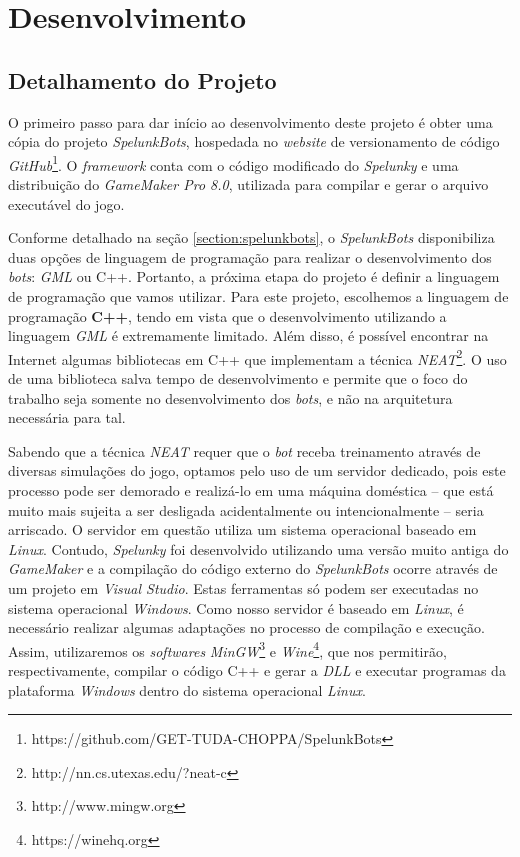 \chapter{\label{chap:development}Desenvolvimento}


\section{\label{section:project-details}Detalhamento do Projeto}
O primeiro passo para dar início ao desenvolvimento deste projeto é obter uma
cópia do projeto \textit{SpelunkBots}, hospedada no \textit{website} de
versionamento de código
\textit{GitHub}\footnote{https://github.com/GET-TUDA-CHOPPA/SpelunkBots}. O
\textit{framework} conta com o código modificado do \textit{Spelunky} e uma
distribuição do \textit{GameMaker Pro 8.0}, utilizada para compilar e gerar o
arquivo executável do jogo.

Conforme detalhado na seção \ref{section:spelunkbots}, o \textit{SpelunkBots}
disponibiliza duas opções de linguagem de programação para realizar o
desenvolvimento dos \textit{bots}: \textit{GML} ou C++. Portanto, a próxima
etapa do projeto é definir a linguagem de programação que vamos utilizar. Para
este projeto, escolhemos a linguagem de programação \textbf{C++}, tendo em vista
que o desenvolvimento utilizando a linguagem \textit{GML} é extremamente
limitado. Além disso, é possível encontrar na Internet algumas bibliotecas em
C++ que implementam a técnica
\textit{NEAT}\footnote{http://nn.cs.utexas.edu/?neat-c}. O uso de uma biblioteca
salva tempo de desenvolvimento e permite que o foco do trabalho seja somente no
desenvolvimento dos \textit{bots}, e não na arquitetura necessária para tal.

Sabendo que a técnica \textit{NEAT} requer que o \textit{bot} receba treinamento
através de diversas simulações do jogo, optamos pelo uso de um servidor
dedicado, pois este processo pode ser demorado e realizá-lo em uma máquina
doméstica -- que está muito mais sujeita a ser desligada acidentalmente ou
intencionalmente -- seria arriscado. O servidor em questão utiliza um sistema
operacional baseado em \textit{Linux}.  Contudo, \textit{Spelunky} foi
desenvolvido utilizando uma versão muito antiga do \textit{GameMaker} e a
compilação do código externo do \textit{SpelunkBots} ocorre através de um
projeto em \textit{Visual Studio}.  Estas ferramentas só podem ser executadas no
sistema operacional \textit{Windows}. Como nosso servidor é baseado em
\textit{Linux}, é necessário realizar algumas adaptações no processo de
compilação e execução. Assim, utilizaremos os \textit{softwares}
\textit{MinGW}\footnote{http://www.mingw.org} e
\textit{Wine}\footnote{https://winehq.org}, que nos permitirão, respectivamente,
compilar o código C++ e gerar a \textit{DLL} e executar programas da plataforma
\textit{Windows} dentro do sistema operacional \textit{Linux}.

